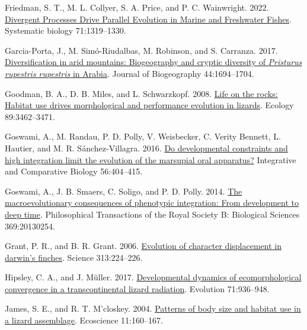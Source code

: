 \documentclass[
  11pt,
]{article}
\newlength{\cslhangindent}
\newlength{\cslentryspacingunit} %
\newenvironment{CSLReferences}[2] %
 {%
  \setlength{\parindent}{0pt}
  \ifodd #1
  \let\oldpar\par
  \def\par{\hangindent=\cslhangindent\oldpar}
  \fi
  \setlength{\parskip}{#2\cslentryspacingunit}
 }%
 {}
\begin{document}
\begin{CSLReferences}{1}{0}
\leavevmode{}%
Friedman, S. T., M. L. Collyer, S. A. Price, and P. C. Wainwright. 2022.
\href{https://doi.org/10.1093/sysbio/syab080}{{Divergent Processes Drive
Parallel Evolution in Marine and Freshwater Fishes}}. Systematic biology
71:1319--1330.

\leavevmode{}%
Garcia-Porta, J., M. Simó-Riudalbas, M. Robinson, and S. Carranza. 2017.
\href{https://doi.org/10.1111/jbi.12929}{Diversification in arid
mountains: Biogeography and cryptic diversity of \emph{{P}risturus
rupestris rupestris} in {A}rabia}. Journal of Biogeography
44:1694--1704.

\leavevmode{}%
Goodman, B. A., D. B. Miles, and L. Schwarzkopf. 2008.
\href{https://doi.org/10.1890/07-2093.1}{{Life on the rocks: Habitat use
drives morphological and performance evolution in lizards}}. Ecology
89:3462--3471.

\leavevmode{}%
Goswami, A., M. Randau, P. D. Polly, V. Weisbecker, C. Verity Bennett,
L. Hautier, and M. R. Sánchez-Villagra. 2016.
\href{https://doi.org/10.1093/icb/icw039}{Do developmental constraints
and high integration limit the evolution of the marsupial oral
apparatus?} Integrative and Comparative Biology 56:404--415.

\leavevmode{}%
Goswami, A., J. B. Smaers, C. Soligo, and P. D. Polly. 2014.
\href{https://doi.org/10.1098/rstb.2013.0254}{The macroevolutionary
consequences of phenotypic integration: From development to deep time}.
Philosophical Transactions of the Royal Society B: Biological Sciences
369:20130254.

\leavevmode{}%
Grant, P. R., and B. R. Grant. 2006.
\href{https://doi.org/10.1126/science.1128374}{Evolution of character
displacement in darwin's finches}. Science 313:224--226.

\leavevmode{}%
Hipsley, C. A., and J. Müller. 2017.
\href{https://doi.org/10.1111/evo.13186}{{Developmental dynamics of
ecomorphological convergence in a transcontinental lizard radiation}}.
Evolution 71:936--948.

\leavevmode{}%
James, S. E., and R. T. M'closkey. 2004.
\href{https://doi.org/10.1080/11956860.2004.11682820}{Patterns of body
size and habitat use in a lizard assemblage}. Ecoscience 11:160--167.


\end{CSLReferences}
\end{document}
